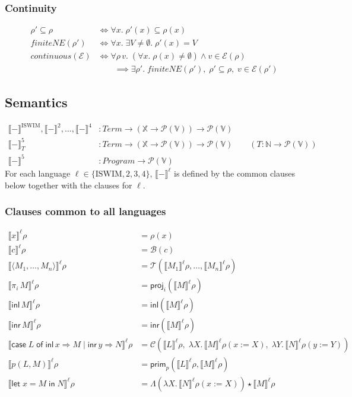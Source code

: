 \documentclass[10pt]{article}
\theoremstyle{acmplain}
\newcommand{\SEM}[1]{\llbracket #1 \rrbracket}
\newcommand{\key}[1]{\mathsf{#1}}
\newcommand{\Let}{\key{let}\;}
\newcommand{\In}{\;\key{in}\;}
\newcommand{\inl}{\key{inl}\,}
\newcommand{\inr}{\key{inr}\,}
\newcommand{\Case}[5]{\key{case}\;#1\;\key{of}\;\key{inl}\,#2 \Rightarrow #3 \mid \key{inr}\,#4 \Rightarrow #5}
\newcommand{\tuple}[1]{\langle #1 \rangle}
\newcommand{\prj}[1]{\pi_{#1}\,}
\newcommand{\SET}[1]{\mathcal{P}(#1)}
\newcommand{\V}{\mathbb{V}}
\newcommand{\X}{\mathbb{X}}
\newcommand{\prim}[3]{#1(#2, #3)}
\newcommand{\ext}[3]{#1(#2{:=}#3)}
\newcommand{\app}{\star}
\newcommand{\NE}{\neq\emptyset}
\begin{document}
\subsubsection{Continuity}

\begin{align*}
  \rho' \subseteq \rho &\iff \forall x.\; \rho'(x) \subseteq \rho(x) \\
  \mathit{finiteNE}(\rho') &\iff \forall x.\; \exists V \NE.\; \rho'(x) = V \\
  \mathit{continuous}(\mathcal{E}) &\iff
    \forall \rho\, v.\; (\forall x.\; \rho(x) \NE) \land v \in \mathcal{E}(\rho) \\
    &\qquad \implies \exists \rho'.\; \mathit{finiteNE}(\rho'),\; \rho' \subseteq \rho,\; v \in \mathcal{E}(\rho')
\end{align*}

\subsection{Semantics}

\begin{align*}
  \SEM{-}^{\mathrm{ISWIM}}, \SEM{-}^{\mathrm{2}}, \ldots, \SEM{-}^{\mathrm{4}}
    &: \mathit{Term} \to (\X \to \SET{\V}) \to \SET{\V} \\
  \SEM{-}^{\mathrm{5}}_T
    &: \mathit{Term} \to (\X \to \SET{\V}) \to \SET{\V}
    \qquad (T : \mathbb{N} \to \SET{\V}) \\
  \SEM{-}^{\mathrm{5}} &: \mathit{Program} \to \SET{\V}
\end{align*}
For each language $\ell \in \{\mathrm{ISWIM}, 2, 3, 4\}$, $\SEM{-}^{\ell}$ is
defined by the common clauses below together with the clauses for $\ell$.

\subsubsection{Clauses common to all languages}

\begin{align*}
  \SEM{x}^{\ell}\rho &= \rho(x) \\
  \SEM{c}^{\ell}\rho &= \mathcal{B}(c) \\
  \SEM{\tuple{M_1,\ldots,M_n}}^{\ell}\rho &= \mathcal{T}(\SEM{M_1}^{\ell}\rho, \ldots, \SEM{M_n}^{\ell}\rho) \\
  \SEM{\prj{i} M}^{\ell}\rho &= \key{proj}_i(\SEM{M}^{\ell}\rho) \\
  \SEM{\inl M}^{\ell}\rho &= \key{inl}(\SEM{M}^{\ell}\rho) \\
  \SEM{\inr M}^{\ell}\rho &= \key{inr}(\SEM{M}^{\ell}\rho) \\
  \SEM{\Case{L}{x}{M}{y}{N}}^{\ell}\rho &=
     \mathcal{C}(\SEM{L}^{\ell}\rho,\; \lambda X.\, \SEM{M}^{\ell}\ext{\rho}{x}{X},\; \lambda Y.\, \SEM{N}^{\ell}\ext{\rho}{y}{Y}) \\
  \SEM{\prim{p}{L}{M}}^{\ell}\rho &= \key{prim}_p(\SEM{L}^{\ell}\rho, \SEM{M}^{\ell}\rho) \\
  \SEM{\Let x = M \In N}^{\ell}\rho &= \Lambda(\lambda X.\, \SEM{N}^{\ell}\ext{\rho}{x}{X}) \app \SEM{M}^{\ell}\rho
\end{align*}
\end{document}
